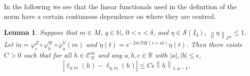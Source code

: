 \documentclass[a4paper,11pt]{amsart}
\newtheorem{lemma}[theorem]{Lemma}
\theoremstyle{remark}
\newcommand{\abs}[1]{\left|#1\right|} %
\newcommand{\cC}{\mathcal{C}} %
\newcommand{\cS}{\mathcal{S}} %
\newcommand{\bN}{\mathbb{N}} %
\newcommand{\bR}{\mathbb{R}} %
\newcommand{\norm}[1]{\left\|#1\right\|} %
\newcommand{\dv}{V} %
\newcommand{\dw}{W} %
\newcommand{\dz}{Z} %
\begin{document}
In the following we see that the linear functionals used in the definition of the norm have a certain continuous dependence on where they are centred.

\begin{lemma}
    \label{lem:slide}
    Suppose that \(m \in M\), \(q\in\bN\), \(0<\epsilon<\delta\), and \(\eta \in \cS(I_{\delta})\), \(\norm{\eta}_{\cC^q} \leq 1\).
    Let \(\tilde{m} = \varphi_c^\dz \circ \varphi_b^\dw \circ \varphi_a^\dv (m)\) and \(\tilde{\eta}(t) = e^{- 2\pi i NK (c + at)} \eta(t)\).
    Then there exists \(C>0\) such that for all \(h \in  \cC^\infty_N\) and any \(a,b,c \in \bR\) with \(\abs{a}, \abs{b} \leq \epsilon\), %
    \[
        \abs{\ell_{\eta,m}(h) - \ell_{\tilde{\eta},\tilde{m}}(h)} \leq C \epsilon \norm{h}_{1,q-1}.
    \]
\end{lemma}
\end{document}
